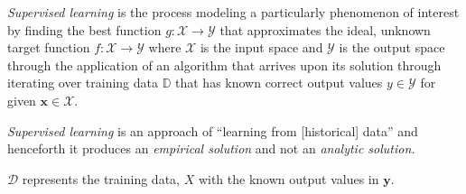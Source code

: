 \documentclass[12pt]{article}
\begin{document}
\begin{enumerate}
\begin{tcolorbox}[colback=white, sharp corners]
\end{tcolorbox}


\begin{tcolorbox}[colback=white, sharp corners]

\emph{Supervised learning} is the process modeling a particularly phenomenon of interest by finding the best function $g: \mathcal{X} \to \mathcal{Y}$ that approximates the ideal, unknown target function $f: \mathcal{X} \to \mathcal{Y}$ where $\mathcal{X}$ is the input space and $\mathcal{Y}$ is the output space through the application of an algorithm that arrives upon its solution through iterating over training data $\mathbb{D}$ that has known correct output values $y \in \mathcal{Y}$ for given $\mathbf{x} \in \mathcal{X}$.

\end{tcolorbox}

\newpage


\begin{tcolorbox}[colback=white, sharp corners]

\emph{Supervised learning} is an approach of ``learning from [historical] data'' and henceforth it produces an \emph{empirical solution} and not an \emph{analytic solution.}

\end{tcolorbox}


\begin{tcolorbox}[colback=white, sharp corners]

$\mathcal{D}$ represents the training data, $X$ with the known output values in $\mathbf{y}$.

\end{tcolorbox}



\end{enumerate}
\end{document}
